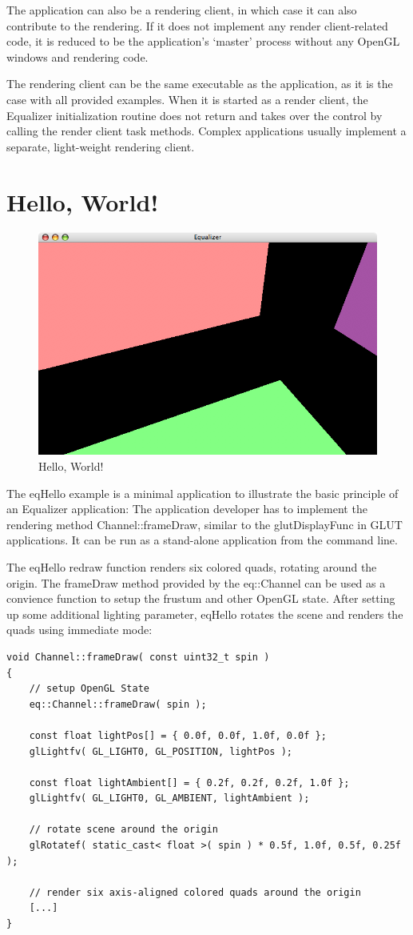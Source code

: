 \documentclass[10pt,a4]{scrartcl}
\begin{document}
The application can also be a rendering client, in which case it can
also contribute to the rendering. If it does not implement any render
client-related code, it is reduced to be the application's `master'
process without any OpenGL windows and rendering code.

The rendering client can be the same executable as the application, as
it is the case with all provided examples. When it is started as a
render client, the Equalizer initialization routine does not return and
takes over the control by calling the render client task
methods. Complex applications usually implement a separate, light-weight
rendering client.


\section{Hello, World!}

\begin{figure}
  \includegraphics[width=.618\textwidth]{images/eqHello.png}
  {\caption{\small\label{fHello}Hello, World!}}
\end{figure}
The \textsf{eqHello} example is a minimal application to illustrate the
basic principle of an Equalizer application: The application developer
has to implement the rendering method \textsf{Channel::frameDraw},
similar to the \textsf{glutDisplayFunc} in GLUT applications. It can be
run as a stand-alone application from the command line.

The \textsf{eqHello} redraw function renders six colored quads, rotating
around the origin. The \textsf{frameDraw} meth\-od provided by the
\textsf{eq::Channel} can be used as a convience function to setup the
frustum and other OpenGL state. After setting up some additional
lighting parameter, \textsf{eqHello} rotates the scene and renders the
quads using immediate mode:

{\footnotesize\begin{lstlisting}
void Channel::frameDraw( const uint32_t spin )
{
    // setup OpenGL State
    eq::Channel::frameDraw( spin );
    
    const float lightPos[] = { 0.0f, 0.0f, 1.0f, 0.0f };
    glLightfv( GL_LIGHT0, GL_POSITION, lightPos );

    const float lightAmbient[] = { 0.2f, 0.2f, 0.2f, 1.0f };
    glLightfv( GL_LIGHT0, GL_AMBIENT, lightAmbient );

    // rotate scene around the origin
    glRotatef( static_cast< float >( spin ) * 0.5f, 1.0f, 0.5f, 0.25f );

    // render six axis-aligned colored quads around the origin
    [...]
}
\end{lstlisting}}
\end{document}
